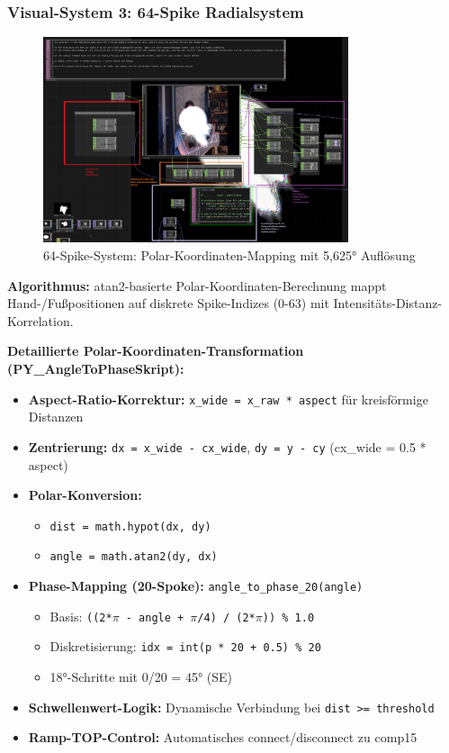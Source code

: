 \subsubsection{Visual-System 3: 64-Spike Radialsystem}

\begin{figure}[h]
    \centering
    \includegraphics[width=0.8\textwidth]{images/docupictures/TopDown_KreisZuRampsParametisierteBerechnungen.png}
    \caption{64-Spike-System: Polar-Koordinaten-Mapping mit 5,625° Auflösung}
    \label{fig:spike_system_production}
\end{figure}

\textbf{Algorithmus:} atan2-basierte Polar-Koordinaten-Berechnung mappt Hand-/Fußpositionen auf diskrete Spike-Indizes (0-63) mit Intensitäts-Distanz-Korrelation.

\textbf{Detaillierte Polar-Koordinaten-Transformation (PY\_AngleToPhaseSkript):}
\begin{itemize}
    \item \textbf{Aspect-Ratio-Korrektur:} \texttt{x\_wide = x\_raw * aspect} für kreisförmige Distanzen
    \item \textbf{Zentrierung:} \texttt{dx = x\_wide - cx\_wide}, \texttt{dy = y - cy} (cx\_wide = 0.5 * aspect)
    \item \textbf{Polar-Konversion:} 
    \begin{itemize}
        \item \texttt{dist = math.hypot(dx, dy)}
        \item \texttt{angle = math.atan2(dy, dx)}
    \end{itemize}
    \item \textbf{Phase-Mapping (20-Spoke):} \texttt{angle\_to\_phase\_20(angle)}
    \begin{itemize}
        \item Basis: \texttt{((2*$\pi$ - angle + $\pi$/4) / (2*$\pi$)) \% 1.0}
        \item Diskretisierung: \texttt{idx = int(p * 20 + 0.5) \% 20}
        \item 18°-Schritte mit 0/20 = 45° (SE)
    \end{itemize}
    \item \textbf{Schwellenwert-Logik:} Dynamische Verbindung bei \texttt{dist >= threshold}
    \item \textbf{Ramp-TOP-Control:} Automatisches connect/disconnect zu comp15
\end{itemize}

